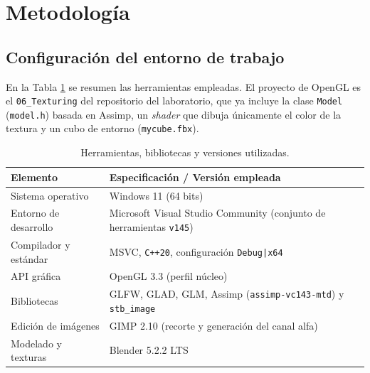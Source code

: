 
\section{Metodología}

\subsection{Configuración del entorno de trabajo}
En la Tabla \ref{tab:requerimientos} se resumen las herramientas empleadas. El proyecto de OpenGL es el \texttt{06\_Texturing} del repositorio del laboratorio, que ya incluye la clase \texttt{Model} (\texttt{model.h}) basada en Assimp, un \textit{shader} que dibuja únicamente el color de la textura y un cubo de entorno (\texttt{mycube.fbx}).

\begin{table}[H]
\centering
\renewcommand{\arraystretch}{1.25}
\begin{tabular}{|p{4.2cm}|p{10.5cm}|}
\hline
\textbf{Elemento} & \textbf{Especificación / Versión empleada} \\ \hline
Sistema operativo & Windows 11 (64 bits) \\ \hline
Entorno de desarrollo & Microsoft Visual Studio Community (conjunto de herramientas \texttt{v145}) \\ \hline
Compilador y estándar & MSVC, \texttt{C++20}, configuración \texttt{Debug|x64} \\ \hline
API gráfica & OpenGL 3.3 (perfil núcleo) \\ \hline
Bibliotecas & GLFW, GLAD, GLM, Assimp (\texttt{assimp-vc143-mtd}) y \texttt{stb\_image} \\ \hline
Edición de imágenes & GIMP 2.10 (recorte y generación del canal alfa) \\ \hline
Modelado y texturas & Blender 5.2.2 LTS \\ \hline
\end{tabular}
\caption{Herramientas, bibliotecas y versiones utilizadas.}
\label{tab:requerimientos}
\end{table}

